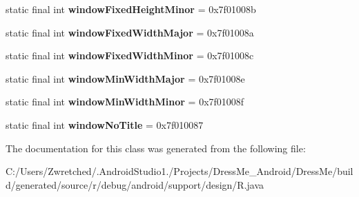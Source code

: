 \begin{DoxyCompactItemize}
\item 
\hypertarget{classandroid_1_1support_1_1design_1_1_r_1_1attr_a0f0ccc630a6cc4c66b09ba8fd1bcf1da}{}static final int {\bfseries window\+Fixed\+Height\+Minor} = 0x7f01008b\label{classandroid_1_1support_1_1design_1_1_r_1_1attr_a0f0ccc630a6cc4c66b09ba8fd1bcf1da}

\item 
\hypertarget{classandroid_1_1support_1_1design_1_1_r_1_1attr_a5f66d47b3609aef3886dcd603ac63345}{}static final int {\bfseries window\+Fixed\+Width\+Major} = 0x7f01008a\label{classandroid_1_1support_1_1design_1_1_r_1_1attr_a5f66d47b3609aef3886dcd603ac63345}

\item 
\hypertarget{classandroid_1_1support_1_1design_1_1_r_1_1attr_a24835259349fddf99fc5c44065de5fb3}{}static final int {\bfseries window\+Fixed\+Width\+Minor} = 0x7f01008c\label{classandroid_1_1support_1_1design_1_1_r_1_1attr_a24835259349fddf99fc5c44065de5fb3}

\item 
\hypertarget{classandroid_1_1support_1_1design_1_1_r_1_1attr_a74613b10ae2f42e095723fcea4f56a36}{}static final int {\bfseries window\+Min\+Width\+Major} = 0x7f01008e\label{classandroid_1_1support_1_1design_1_1_r_1_1attr_a74613b10ae2f42e095723fcea4f56a36}

\item 
\hypertarget{classandroid_1_1support_1_1design_1_1_r_1_1attr_a1690dd58d6b1695579d1cbdcb36fa7b4}{}static final int {\bfseries window\+Min\+Width\+Minor} = 0x7f01008f\label{classandroid_1_1support_1_1design_1_1_r_1_1attr_a1690dd58d6b1695579d1cbdcb36fa7b4}

\item 
\hypertarget{classandroid_1_1support_1_1design_1_1_r_1_1attr_ae7659b443bdf6ecfbb0bb28a213c6670}{}static final int {\bfseries window\+No\+Title} = 0x7f010087\label{classandroid_1_1support_1_1design_1_1_r_1_1attr_ae7659b443bdf6ecfbb0bb28a213c6670}

\end{DoxyCompactItemize}


The documentation for this class was generated from the following file\+:\begin{DoxyCompactItemize}
\item 
C\+:/\+Users/\+Zwretched/.\+Android\+Studio1./\+Projects/\+Dress\+Me\+\_\+\+Android/\+Dress\+Me/build/generated/source/r/debug/android/support/design/R.\+java\end{DoxyCompactItemize}

